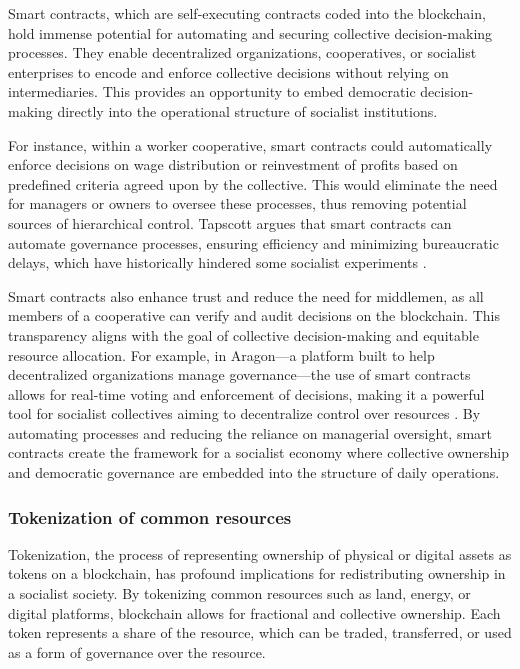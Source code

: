 \begin{refsection}
Smart contracts, which are self-executing contracts coded into the blockchain, hold immense potential for automating and securing collective decision-making processes. They enable decentralized organizations, cooperatives, or socialist enterprises to encode and enforce collective decisions without relying on intermediaries. This provides an opportunity to embed democratic decision-making directly into the operational structure of socialist institutions.

For instance, within a worker cooperative, smart contracts could automatically enforce decisions on wage distribution or reinvestment of profits based on predefined criteria agreed upon by the collective. This would eliminate the need for managers or owners to oversee these processes, thus removing potential sources of hierarchical control. Tapscott argues that smart contracts can automate governance processes, ensuring efficiency and minimizing bureaucratic delays, which have historically hindered some socialist experiments \cite[pp.~205-210]{tapscott2016}.

Smart contracts also enhance trust and reduce the need for middlemen, as all members of a cooperative can verify and audit decisions on the blockchain. This transparency aligns with the goal of collective decision-making and equitable resource allocation. For example, in Aragon—a platform built to help decentralized organizations manage governance—the use of smart contracts allows for real-time voting and enforcement of decisions, making it a powerful tool for socialist collectives aiming to decentralize control over resources \cite[pp.~98-101]{scholz2020}. By automating processes and reducing the reliance on managerial oversight, smart contracts create the framework for a socialist economy where collective ownership and democratic governance are embedded into the structure of daily operations.

\subsubsection{Tokenization of common resources}

Tokenization, the process of representing ownership of physical or digital assets as tokens on a blockchain, has profound implications for redistributing ownership in a socialist society. By tokenizing common resources such as land, energy, or digital platforms, blockchain allows for fractional and collective ownership. Each token represents a share of the resource, which can be traded, transferred, or used as a form of governance over the resource.


\end{refsection}
